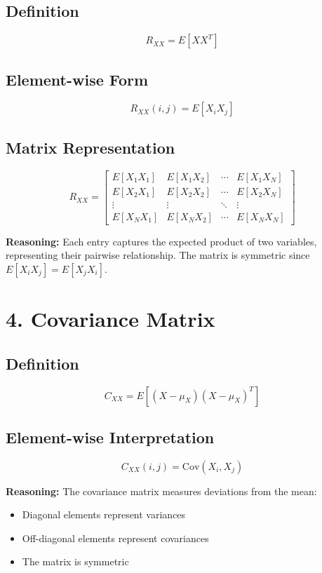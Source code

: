 \documentclass{article}
\begin{document}
\subsection*{Definition}
\[
R_{XX} = E[XX^T]
\]

\subsection*{Element-wise Form}
\[
R_{XX}(i,j) = E[X_i X_j]
\]

\subsection*{Matrix Representation}
\[
R_{XX} =
\begin{bmatrix}
E[X_1X_1] & E[X_1X_2] & \cdots & E[X_1X_N] \\
E[X_2X_1] & E[X_2X_2] & \cdots & E[X_2X_N] \\
\vdots & \vdots & \ddots & \vdots \\
E[X_NX_1] & E[X_NX_2] & \cdots & E[X_NX_N]
\end{bmatrix}
\]

\textbf{Reasoning:}  
Each entry captures the expected product of two variables, representing their pairwise relationship. The matrix is symmetric since $E[X_i X_j] = E[X_j X_i]$.

\section*{4. Covariance Matrix}

\subsection*{Definition}
\[
C_{XX} = E[(X - \mu_X)(X - \mu_X)^T]
\]

\subsection*{Element-wise Interpretation}
\[
C_{XX}(i,j) = \text{Cov}(X_i, X_j)
\]

\textbf{Reasoning:}  
The covariance matrix measures deviations from the mean:
\begin{itemize}
\item Diagonal elements represent variances
\item Off-diagonal elements represent covariances
\item The matrix is symmetric
\end{itemize}
\end{document}
